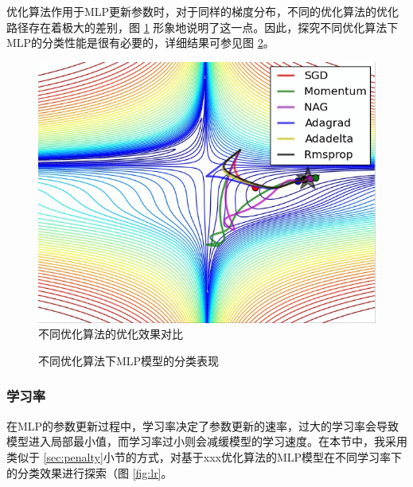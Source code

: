 \documentclass[12pt,a4paper]{article}
\theoremstyle{definition}
\begin{document}
优化算法作用于MLP更新参数时，对于同样的梯度分布，不同的优化算法的优化路径存在着极大的差别，图 \ref{fig:optim-ref} 形象地说明了这一点。因此，探究不同优化算法下MLP的分类性能是很有必要的，详细结果可参见图 \ref{fig:optim1}。

\begin{figure}[H]
	\centering
	\includegraphics[width=0.5\linewidth]{img/optim_example.png}
	\caption{不同优化算法的优化效果对比 \cite{optim_example}}
	\label{fig:optim-ref}
\end{figure}

\begin{figure}[H]
	\centering
	\caption{不同优化算法下MLP模型的分类表现}
	\label{fig:optim1}
\end{figure}

\subsubsection{学习率}

在MLP的参数更新过程中，学习率决定了参数更新的速率，过大的学习率会导致模型进入局部最小值，而学习率过小则会减缓模型的学习速度。在本节中，我采用类似于 \ref{sec:penalty}小节的方式，对基于xxx优化算法的MLP模型在不同学习率下的分类效果进行探索（图 \ref{fig:lr}。
\end{document}
